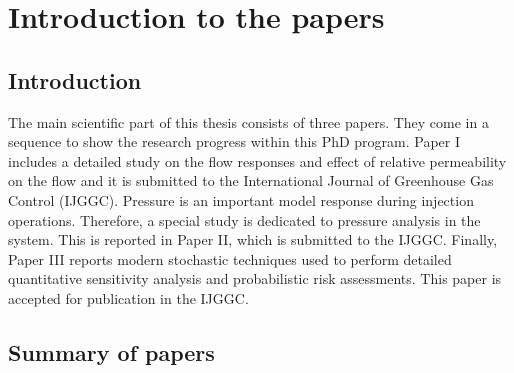 \chapter{Introduction to the papers}

\pagebreak
\section{Introduction}

The main scientific part of this thesis consists of three papers. They come in a
sequence to show the research progress within this PhD program. Paper
I includes a detailed study on the flow responses and effect of relative
permeability on the flow and it is submitted to the International Journal of
Greenhouse Gas Control (IJGGC). Pressure is an important model response during
injection operations. Therefore, a special study is dedicated to pressure
analysis in the system. This is reported in Paper II, which is submitted to the
IJGGC. Finally, Paper III reports modern stochastic techniques used to perform
detailed quantitative sensitivity analysis and probabilistic risk assessments.
This paper is accepted for publication in the IJGGC.

\section{Summary of papers}

